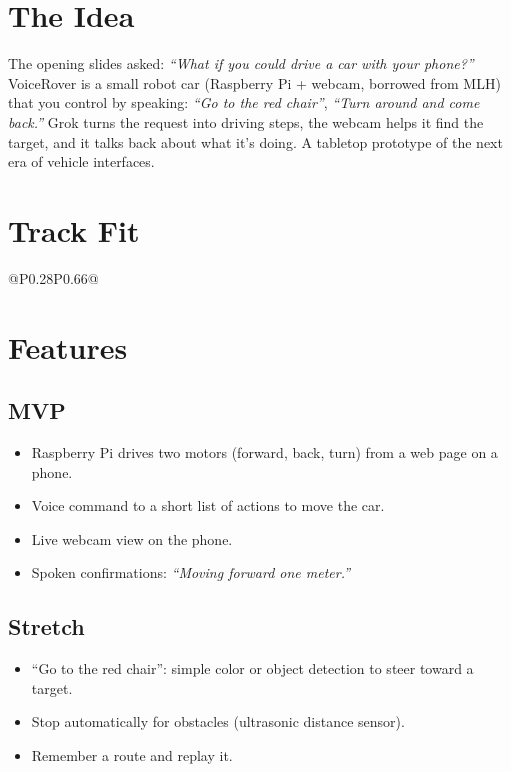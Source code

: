\documentclass[11pt]{article}
\begin{document}

\section{The Idea}
The opening slides asked: \emph{``What if you could drive a car with your phone?''}
VoiceRover is a small robot car (Raspberry Pi + webcam, borrowed from MLH) that you
control by speaking: \emph{``Go to the red chair''}, \emph{``Turn around and come
back.''} Grok turns the request into driving steps, the webcam helps it find the
target, and it talks back about what it's doing. A tabletop prototype of the
next era of vehicle interfaces.

\section{Track Fit}
\begin{tabular}{@{}P{0.28\textwidth}P{0.66\textwidth}@{}}
\toprule
{}
\bottomrule
\end{tabular}

\section{Features}
\subsection{MVP}
\begin{itemize}
  \item Raspberry Pi drives two motors (forward, back, turn) from a web page on a phone.
  \item Voice command to a short list of actions to move the car.
  \item Live webcam view on the phone.
  \item Spoken confirmations: \emph{``Moving forward one meter.''}
\end{itemize}
\subsection{Stretch}
\begin{itemize}
  \item ``Go to the red chair'': simple color or object detection to steer toward a target.
  \item Stop automatically for obstacles (ultrasonic distance sensor).
  \item Remember a route and replay it.
\end{itemize}
\end{document}
